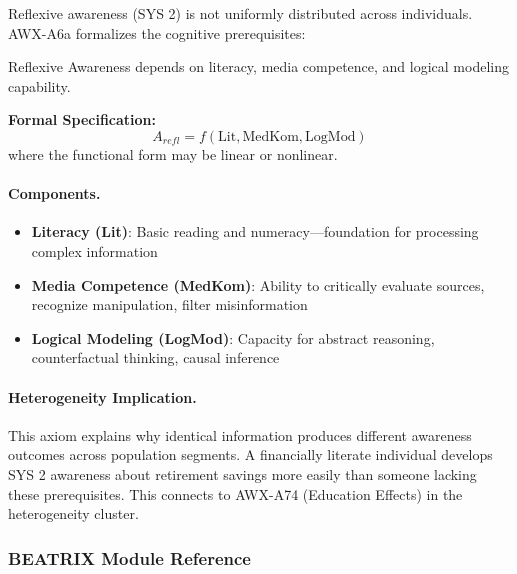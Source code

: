 Reflexive awareness (SYS 2) is not uniformly distributed across individuals. 
AWX-A6a formalizes the cognitive prerequisites:

\begin{axiom}
Reflexive Awareness depends on literacy, media competence, and logical 
modeling capability.

\textbf{Formal Specification:}
\begin{equation}
A_{refl} = f(\text{Lit}, \text{MedKom}, \text{LogMod})
\end{equation}
where the functional form may be linear or nonlinear.
\end{axiom}

\paragraph{Components.}
\begin{itemize}
    \item \textbf{Literacy (Lit)}: Basic reading and numeracy---foundation for 
          processing complex information
    \item \textbf{Media Competence (MedKom)}: Ability to critically evaluate 
          sources, recognize manipulation, filter misinformation
    \item \textbf{Logical Modeling (LogMod)}: Capacity for abstract reasoning, 
          counterfactual thinking, causal inference
\end{itemize}

\paragraph{Heterogeneity Implication.}
This axiom explains why identical information produces different awareness 
outcomes across population segments. A financially literate individual 
develops SYS 2 awareness about retirement savings more easily than someone 
lacking these prerequisites. This connects to AWX-A74 (Education Effects) 
in the heterogeneity cluster.

\subsubsection{BEATRIX Module Reference}

